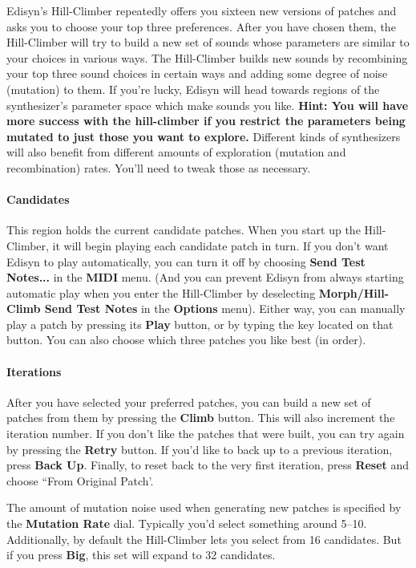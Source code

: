 \documentclass{article}
\begin{document}
Edisyn's Hill-Climber repeatedly offers you sixteen new versions of patches and asks you to choose your top three preferences.  After you have chosen them, the Hill-Climber will try to build a new set of sounds whose parameters are similar to your choices in various ways.  The Hill-Climber builds new sounds by recombining your top three sound choices in certain ways and adding some degree of noise (mutation) to them.   If you're lucky, Edisyn will head towards regions of the synthesizer's parameter space which make sounds you like.  {\bf Hint:  You will have more success with the hill-climber if you restrict the parameters being mutated to just those you want to explore.}  Different kinds of synthesizers will also benefit from different amounts of exploration (mutation and recombination) rates.  You'll need to tweak those as necessary.

\paragraph{Candidates} This region holds the current candidate patches. When you start up the Hill-Climber, it will begin playing each candidate patch in turn.  If you don't want Edisyn to play automatically, you can turn it off by choosing {\bf Send Test Notes...} in the {\bf MIDI} menu.  (And you can prevent Edisyn from always starting automatic play when you enter the Hill-Climber by deselecting {\bf Morph/Hill-Climb Send Test Notes} in the {\bf Options} menu).  Either way, you can manually play a patch by pressing its {\bf Play} button, or by typing the key located on that button.   You can also choose which three patches you like best (in order).

\paragraph{Iterations} After you have selected your preferred patches, you can build a new set of patches from them by pressing the {\bf Climb} button.  This will also increment the iteration number.  If you don't like the patches that were built, you can try again by pressing the {\bf Retry} button.  If you'd like to back up to a previous iteration, press {\bf Back Up}.  Finally, to reset back to the very first iteration, press {\bf Reset} and choose ``From Original Patch'.

The amount of mutation noise used when generating new patches is specified by the {\bf Mutation Rate} dial.  Typically you'd select something around 5--10.  Additionally, by default the Hill-Climber lets you select from 16 candidates.  But if you press {\bf Big}, this set will expand to 32 candidates.
\end{document}
